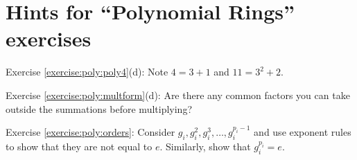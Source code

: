 \section{Hints for ``Polynomial Rings'' exercises}\label{sec:polyrings:hints} 

\noindent Exercise \ref{exercise:poly:poly4}(d):  Note $4=3+1$ and $11=3^2+2$.

\noindent Exercise \ref{exercise:poly:multform}(d): Are there any common factors you can take outside 
the summations before multiplying?

\noindent Exercise \ref{exercise:poly:orders}:  Consider $g_i, g_i^2, g_i^3, \ldots, g_i^{p_i-1}$ and use exponent rules to show that they are not equal to $e$.  Similarly, show that $g_i^{p_i} = e$.
 